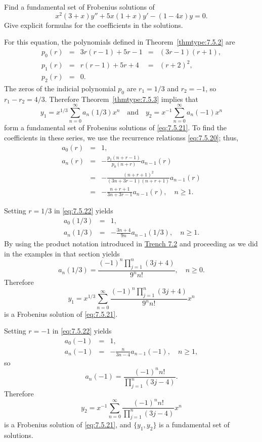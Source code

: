 \documentclass{ximera}
\begin{document}
\begin{example}\label{example:7.5.2}
Find a fundamental set of Frobenius  solutions of
\begin{equation} \label{eq:7.5.21}
x^2(3+x)y''+5x(1+x)y'-(1-4x)y=0.
\end{equation}
Give explicit  formulas for the coefficients in the solutions.

\begin{explanation}
For this equation, the polynomials defined in
Theorem~\ref{thmtype:7.5.2} are
$$
\begin{array}{ccccc}
p_0(r)&=&3r(r-1)+5r-1&=&(3r-1)(r+1),\\
p_1(r)&=&r(r-1)+5r+4&=&(r+2)^2,\\
p_2(r)&=&0.
\end{array}
$$
The zeros of the indicial polynomial $p_0$ are $r_1=1/3$ and $r_2=-1$,
so $r_1-r_2=4/3$. Therefore Theorem~\ref{thmtype:7.5.3} implies that
$$
y_1=x^{1/3}\sum_{n=0}^\infty a_n(1/3)x^n\quad\mbox{and}\quad
y_2=x^{-1}\sum_{n=0}^\infty a_n(-1)x^n
$$
form a fundamental set of Frobenius solutions of \eqref{eq:7.5.21}. To
find the coefficients in these series, we use the recurrence relationss
\eqref{eq:7.5.20};   thus,
\begin{equation} \label{eq:7.5.22}
\begin{array}{ccl}
a_0(r)&=&1,\\
a_n(r)&=&-\frac{p_1(n+r-1)}{p_0(n+r)}a_{n-1}(r)\\
&=&-\frac{(n+r+1)^2}{(3n+3r-1)(n+r+1)}a_{n-1}(r)\\
&=&-\frac{n+r+1}{3n+3r-1}a_{n-1}(r),\quad n\geq1.
\end{array}
\end{equation}

Setting $r=1/3$ in \eqref{eq:7.5.22} yields
\begin{eqnarray*}
a_0(1/3)&=&1,\\
a_n(1/3)&=&-\frac{3n+4}{9n} a_{n-1}(1/3),\quad n\geq1.
\end{eqnarray*}
By using the product notation introduced in \href{https://ximera.osu.edu/ode/main/seriesSolNearOrdinaryPtI/seriesSolNearOrdinaryPtI}{Trench 7.2} and
proceeding as we did in the examples in that section yields
$$
a_n(1/3)=\frac{(-1)^n\prod_{j=1}^n(3j+4)}{9^nn!},\quad n\geq0.
$$
Therefore
$$
y_1=x^{1/3}\sum_{n=0}^\infty\frac{(-1)^n\prod_{j=1}^n(3j+4)}{9^nn!}x^n
$$
is a Frobenius solution of \eqref{eq:7.5.21}.

Setting $r=-1$ in \eqref{eq:7.5.22} yields
\begin{eqnarray*}
a_0(-1)&=&1,\\
a_n(-1)&=&-\frac{n}{3n-4}a_{n-1}(-1),\quad n\geq1,
\end{eqnarray*}
so
$$
a_n(-1)=\frac{(-1)^nn!}{\prod_{j=1}^n(3j-4)}.
$$
Therefore
$$
y_2=x^{-1}\sum_{n=0}^\infty\frac{(-1)^nn!}{\prod_{j=1}^n(3j-4)}x^n
$$
is a Frobenius solution of \eqref{eq:7.5.21}, and $\{y_1,y_2\}$ is a
fundamental set of solutions.
\end{explanation}
\end{example}
\end{document}

